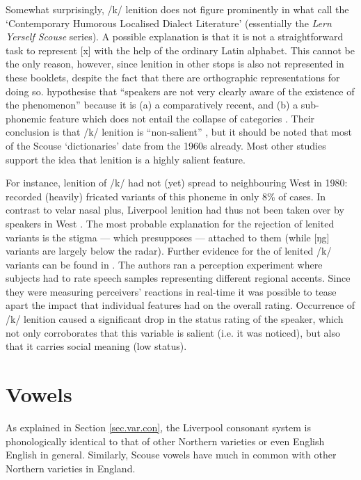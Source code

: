 Somewhat surprisingly, /k/ lenition does not figure prominently in what \textcite{honeybonewatson2013} call the `Contemporary Humorous Localised Dialect Literature' (essentially the \emph{Lern Yerself Scouse} series).
A possible explanation is that it is not a straightforward task to represent [x] with the help of the ordinary Latin alphabet.
This cannot be the only reason, however, since lenition in other stops is also not represented in these booklets, despite the fact that there are orthographic representations for doing so.
\textcite{honeybonewatson2013} hypothesise that ``speakers are not very clearly aware of the existence of the phenomenon'' because it is (a) a comparatively recent, and (b) a sub-phonemic feature which does not entail the collapse of categories \parencite[cf.][329--331]{honeybonewatson2013}.
Their conclusion is that /k/ lenition is ``non-salient'' \parencite[333]{honeybonewatson2013}, but it should be noted that most of the Scouse `dictionaries' date from the 1960s already.
Most other studies support the idea that lenition is a highly salient feature.

For instance, lenition of /k/ had not (yet) spread to neighbouring West  in 1980: \textcite[97]{newbrook1999} recorded (heavily) fricated variants of this phoneme in only 8\% of cases.
In contrast to velar nasal plus, Liverpool lenition had thus not been taken over by speakers in West .
The most probable explanation for the rejection of lenited variants is the stigma --- which presupposes  --- attached to them (while [ŋg] variants are largely below the radar).
Further evidence for the  of lenited /k/ variants can be found in \citealt{watsonclark2015}.
The authors ran a perception experiment where subjects had to rate speech samples representing different regional accents.
Since they were measuring perceivers' reactions in real-time it was possible to tease apart the impact that individual features had on the overall rating.
Occurrence of /k/ lenition caused a significant drop in the status rating of the speaker, which not only corroborates that this variable is salient (i.e. it was noticed), but also that it carries social meaning (low status).

	\section{Vowels}\label{sec.var.vow}

As explained in Section \ref{sec.var.con}, the Liverpool consonant system is phonologically identical to that of other Northern varieties or even English English in general.
Similarly, Scouse vowels have much in common with other Northern varieties in England.

